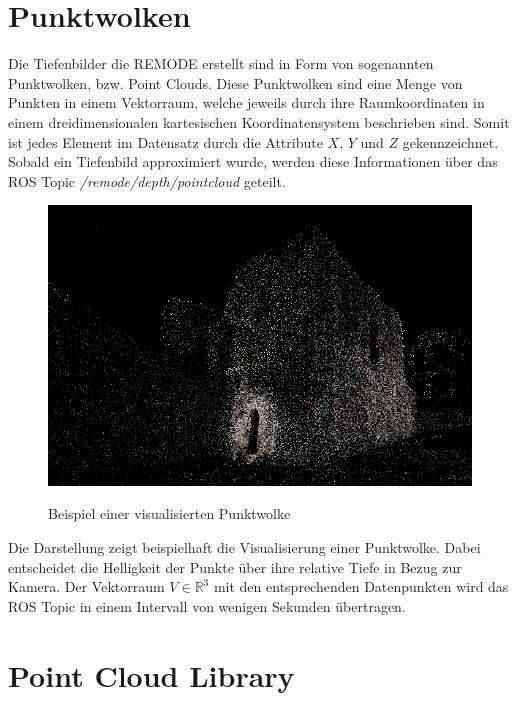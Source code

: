 \section{Punktwolken}
\label{Punktwolken}
Die Tiefenbilder die REMODE erstellt sind in Form von sogenannten Punktwolken, bzw. Point Clouds. Diese Punktwolken sind eine Menge von Punkten in einem Vektorraum, welche jeweils durch ihre Raumkoordinaten in einem dreidimensionalen kartesischen Koordinatensystem beschrieben sind. Somit ist jedes Element im Datensatz durch die Attribute $X$, $Y$ und $Z$ gekennzeichnet. \cite{defPC}\cite{visPC}\ \newline
Sobald ein Tiefenbild approximiert wurde, werden diese Informationen über das ROS Topic \textit{/remode/depth/pointcloud} geteilt. \newline

\begin{figure}[ht]
	\centering
	\includegraphics[scale=0.41]{Bilder/pointcloud_1.jpg}
	\label{fig:pointcloud}
	\caption{Beispiel einer visualisierten Punktwolke \cite{visPC}}
\end{figure}

Die Darstellung zeigt beispielhaft die Visualisierung einer Punktwolke. Dabei entscheidet die Helligkeit der Punkte über ihre relative Tiefe in Bezug zur Kamera. Der Vektorraum $V \in \mathbb{R}^3$ mit den entsprechenden Datenpunkten wird das ROS Topic in einem Intervall von wenigen Sekunden übertragen.\newline

\section{Point Cloud Library}

